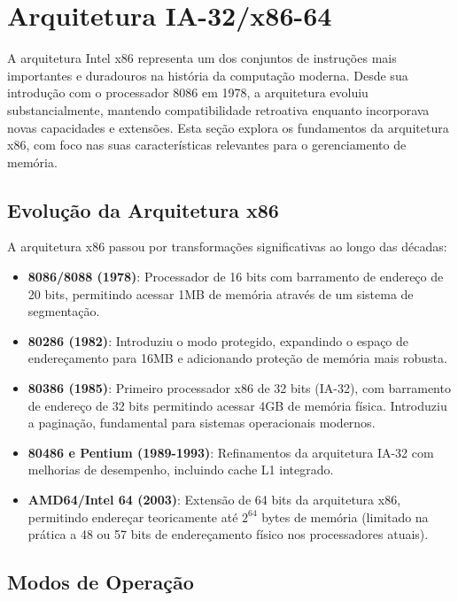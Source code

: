 \section{Arquitetura IA-32/x86-64}
\label{sec:b01_computador}

A arquitetura Intel x86 representa um dos conjuntos de instruções mais importantes e duradouros na história da computação moderna. Desde sua introdução com o processador 8086 em 1978, a arquitetura evoluiu substancialmente, mantendo compatibilidade retroativa enquanto incorporava novas capacidades e extensões. Esta seção explora os fundamentos da arquitetura x86, com foco nas suas características relevantes para o gerenciamento de memória.

\subsection{Evolução da Arquitetura x86}
\label{subsec:evolucao}

A arquitetura x86 passou por transformações significativas ao longo das décadas:

\begin{itemize}
    \item \textbf{8086/8088 (1978)}: Processador de 16 bits com barramento de endereço de 20 bits, permitindo acessar 1MB de memória através de um sistema de segmentação.

    \item \textbf{80286 (1982)}: Introduziu o modo protegido, expandindo o espaço de endereçamento para 16MB e adicionando proteção de memória mais robusta.

    \item \textbf{80386 (1985)}: Primeiro processador x86 de 32 bits (IA-32), com barramento de endereço de 32 bits permitindo acessar 4GB de memória física. Introduziu a paginação, fundamental para sistemas operacionais modernos.

    \item \textbf{80486 e Pentium (1989-1993)}: Refinamentos da arquitetura IA-32 com melhorias de desempenho, incluindo cache L1 integrado.

    \item \textbf{AMD64/Intel 64 (2003)}: Extensão de 64 bits da arquitetura x86, permitindo endereçar teoricamente até $2^{64}$ bytes de memória (limitado na prática a 48 ou 57 bits de endereçamento físico nos processadores atuais).
\end{itemize}

\subsection{Modos de Operação}
\label{subsec:modos}

